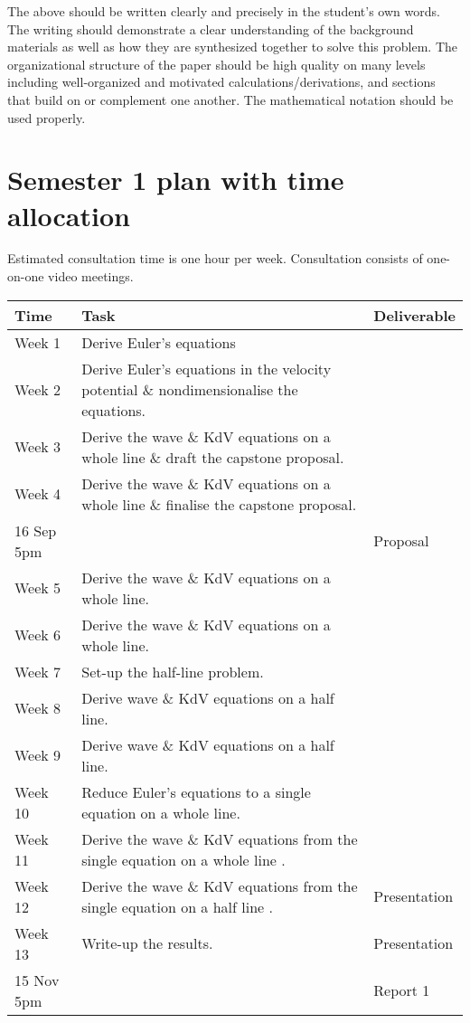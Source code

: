 \documentclass[10pt, oneside, a4paper]{article}
\begin{document}
The above should be written clearly and precisely in the student's own words.  The writing should demonstrate a clear understanding of the background materials as well as how they are synthesized together to solve this problem.  The organizational structure of the paper should be high quality on many levels including well-organized and motivated calculations/derivations, and sections that build on or complement one another.  The mathematical notation should be used properly.  


\section{Semester 1 plan with time allocation}

Estimated consultation time is one hour per week. Consultation consists of one-on-one video meetings.

\begin{center}
    \begin{tabular}{|l|l|l|} 
        \hline
        Time & Task & Deliverable\\
        \hline
        Week 1 & Derive Euler's equations & \\ 
        \hline
        Week 2 & Derive Euler's equations in the velocity potential \& nondimensionalise the equations. & \\ 
        \hline
        Week 3 & Derive the wave \& KdV equations on a whole line \& draft the capstone proposal.&\\
        \hline
        Week 4 & Derive the wave \& KdV equations on a whole line \& finalise the capstone proposal. &\\
        \hline 
        16 Sep 5pm & & Proposal\\
        \hline
        Week 5 & Derive the wave \& KdV equations on a whole line. &\\
        \hline
        Week 6 & Derive the wave \& KdV equations on a whole line. &\\
        \hline
        Week 7 & Set-up the half-line problem. &\\
        \hline
        Week 8 & Derive wave \& KdV equations on a half line. &\\
        \hline
        Week 9 & Derive wave \& KdV equations on a half line.  &\\
        \hline
        Week 10 & Reduce Euler's equations to a single equation on a whole line.&\\
        \hline
        Week 11 & Derive the wave \& KdV equations from the single equation on a whole line .&\\
        \hline
        Week 12 & Derive the wave \& KdV equations from the single equation on a half line .& Presentation\\
        \hline
        Week 13 & Write-up the results.& Presentation\\
        \hline
        15 Nov 5pm & & Report 1\\
        \hline
    \end{tabular}
 
\end{center}
\end{document}
